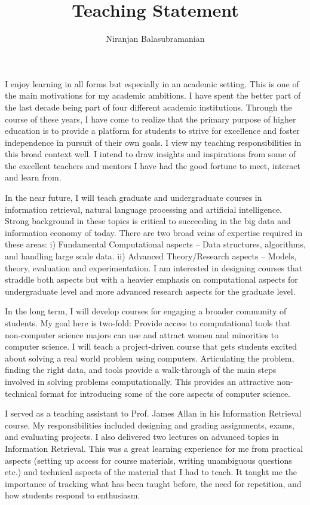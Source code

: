 \documentclass[a4paper,11pt,onecolumn]{article}
\begin{document}

\title{Teaching Statement}
\author{Niranjan Balasubramanian}
\maketitle

I enjoy learning in all forms but especially in an academic setting. This is one of the main motivations for my academic ambitions. I have spent the better part of the last decade being part of four different academic institutions. Through the course of these years, I have come to realize that the primary purpose of higher education is to provide a platform for students to strive for excellence and foster independence in pursuit of their own goals. I view my teaching responsibilities in this broad context well. I intend to draw insights and inspirations from some of the excellent teachers and mentors I have had the good fortune to meet, interact and learn from.

In the near future, I will teach graduate and undergraduate courses in information retrieval, natural language processing and artificial intelligence. Strong background in these topics is critical to succeeding in the big data and information economy of today. There are two broad veins of expertise required in these areas: i) Fundamental Computational aspects -- Data structures, algorithms, and handling large scale data. ii) Advanced Theory/Research aspects -- Models, theory, evaluation and experimentation. I am interested in designing courses that straddle both aspects but with a heavier emphasis on computational aspects for undergraduate level and more advanced research aspects for the graduate level.

In the long term, I will develop courses for engaging a broader community of students. My goal here is two-fold: Provide access to computational tools that non-computer science majors can use and attract women and minorities to computer science. I will teach a project-driven course that gets students excited about solving a real world problem using computers. Articulating the problem, finding the right data, and tools provide a walk-through of the main steps involved in solving problems computationally. This provides an attractive non-technical format for introducing some of the core aspects of computer science. 

I served as a teaching assistant to Prof. James Allan in his Information Retrieval course. My responsibilities included designing and grading assignments, exams, and evaluating projects. I also delivered two lectures on advanced topics in Information Retrieval. This was a great learning experience for me from practical aspects (setting up access for course materials, writing unambiguous questions etc.) and technical aspects of the material that I had to teach. It taught me the importance of tracking what has been taught before, the need for repetition, and how students respond to enthusiasm.
\end{document}
